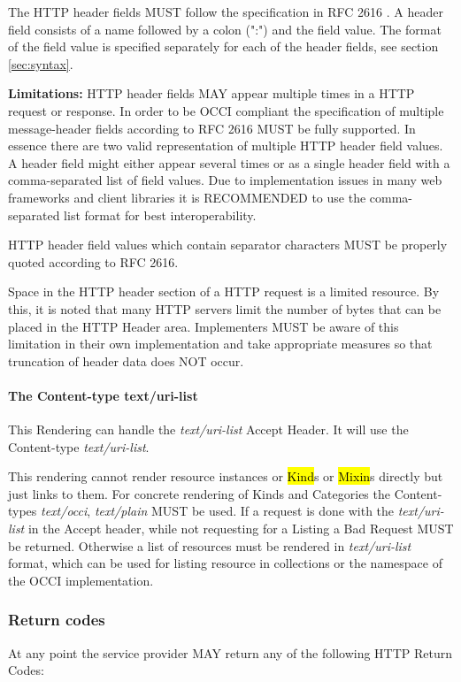 \documentclass[10pt,a4paper]{article}
\begin{document}
The HTTP header fields MUST follow the specification in RFC 2616
\cite{rfc2616}. A header field consists of a name followed by a colon
(":") and the field value. The format of the field value is specified
separately for each of the header fields, see section
\ref{sec:syntax}.

\textbf{Limitations: } HTTP header fields MAY appear multiple times in
a HTTP request or response. In order to be OCCI compliant the
specification of multiple message-header fields according to RFC 2616
MUST be fully supported. In essence there are two valid representation
of multiple HTTP header field values. A header field might either
appear several times or as a single header field with a
comma-separated list of field values. Due to implementation issues in
many web frameworks and client libraries it is RECOMMENDED to use the
comma-separated list format for best interoperability.

HTTP header field values which contain separator characters MUST be
properly quoted according to RFC 2616.

Space in the HTTP header section of a HTTP request is a limited
resource. By this, it is noted that many HTTP servers limit the number
of bytes that can be placed in the HTTP Header area. Implementers MUST
be aware of this limitation in their own implementation and take
appropriate measures so that truncation of header data does NOT occur.

\paragraph{The Content-type text/uri-list}
This Rendering can handle the \textit{text/uri-list} Accept Header. It
will use the Content-type \textit{text/uri-list}.

This rendering cannot render resource instances or \hl{Kind}s or
\hl{Mixin}s directly but just links to them. For concrete rendering of
Kinds and Categories the Content-types \textit{text/occi},
\textit{text/plain} MUST be used. If a request is done with the
\textit{text/uri-list} in the Accept header, while not requesting for
a Listing a Bad Request MUST be returned. Otherwise a list of
resources must be rendered in \emph{text/uri-list} format, which can
be used for listing resource in collections or the namespace of the
OCCI implementation.

\subsubsection{Return codes}
\label{sec:return_codes}
At any point the service provider MAY return any of the following HTTP
Return Codes:
\end{document}
